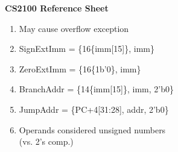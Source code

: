 \documentclass[11pt]{article}
\begin{document}
\pagestyle{empty}

\textbf{\Huge CS2100 Reference Sheet}

\vspace{1em}

\begin{minipage}[t]{0.7\linewidth}
    
\end{minipage}
\hfill
\begin{minipage}[t]{0.28\linewidth}
    

    \vspace{1em}

    

    \vspace{1em}
    \vspace{1ex}

    \begin{enumerate}[label=\alph*.,leftmargin=1ex]
        \item {May cause overflow exception}
        \item {SignExtImm = \{16\{imm[15]\}, imm\}}
        \item {ZeroExtImm = \{16\{1b'0\}, imm\}}
        \item {BranchAddr = \{14\{imm[15]\}, imm, 2'b0\}}
        \item {JumpAddr = \{PC+4[31:28], addr, 2'b0\}}
        \item {Operands considered unsigned numbers \\ (vs. 2's comp.)}
    \end{enumerate}
\end{minipage}

\vfill
\end{document}

